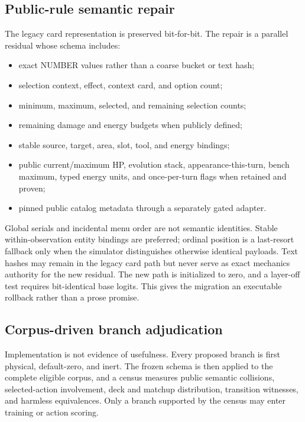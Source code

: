\subsection{Public-rule semantic repair}

The legacy card representation is preserved bit-for-bit. The repair is a
parallel residual whose schema includes:

\begin{itemize}
\item exact NUMBER values rather than a coarse bucket or text hash;
\item selection context, effect, context card, and option count;
\item minimum, maximum, selected, and remaining selection counts;
\item remaining damage and energy budgets when publicly defined;
\item stable source, target, area, slot, tool, and energy bindings;
\item public current/maximum HP, evolution stack, appearance-this-turn, bench
maximum, typed energy units, and once-per-turn flags when retained and proven;
\item pinned public catalog metadata through a separately gated adapter.
\end{itemize}

Global serials and incidental menu order are not semantic identities. Stable
within-observation entity bindings are preferred; ordinal position is a
last-resort fallback only when the simulator distinguishes otherwise identical
payloads. Text hashes may remain in the legacy card path but never serve as
exact mechanics authority for the new residual. The new path is initialized to
zero, and a layer-off test requires bit-identical base logits. This gives the
migration an executable rollback rather than a prose promise.

\subsection{Corpus-driven branch adjudication}

Implementation is not evidence of usefulness. Every proposed branch is first
physical, default-zero, and inert. The frozen schema is then applied to the
complete eligible corpus, and a census measures public semantic collisions,
selected-action involvement, deck and matchup distribution, transition
witnesses, and harmless equivalences. Only a branch supported by the census may
enter training or action scoring.

